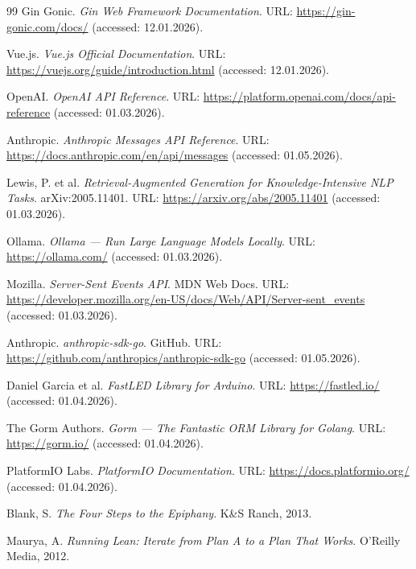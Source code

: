 \documentclass[a4paper,12pt]{article}
\begin{document}
\begin{thebibliography}{99}
Gin Gonic. \textit{Gin Web Framework Documentation}. URL: \url{https://gin-gonic.com/docs/} (accessed: 12.01.2026).

Vue.js. \textit{Vue.js Official Documentation}. URL: \url{https://vuejs.org/guide/introduction.html} (accessed: 12.01.2026).

OpenAI. \textit{OpenAI API Reference}. URL: \url{https://platform.openai.com/docs/api-reference} (accessed: 01.03.2026).

Anthropic. \textit{Anthropic Messages API Reference}. URL: \url{https://docs.anthropic.com/en/api/messages} (accessed: 01.05.2026).

Lewis, P. et al. \textit{Retrieval-Augmented Generation for Knowledge-Intensive NLP Tasks}. arXiv:2005.11401. URL: \url{https://arxiv.org/abs/2005.11401} (accessed: 01.03.2026).

Ollama. \textit{Ollama --- Run Large Language Models Locally}. URL: \url{https://ollama.com/} (accessed: 01.03.2026).

Mozilla. \textit{Server-Sent Events API}. MDN Web Docs. URL: \url{https://developer.mozilla.org/en-US/docs/Web/API/Server-sent_events} (accessed: 01.03.2026).

Anthropic. \textit{anthropic-sdk-go}. GitHub. URL: \url{https://github.com/anthropics/anthropic-sdk-go} (accessed: 01.05.2026).

Daniel Garcia et al. \textit{FastLED Library for Arduino}. URL: \url{https://fastled.io/} (accessed: 01.04.2026).

The Gorm Authors. \textit{Gorm --- The Fantastic ORM Library for Golang}. URL: \url{https://gorm.io/} (accessed: 01.04.2026).

PlatformIO Labs. \textit{PlatformIO Documentation}. URL: \url{https://docs.platformio.org/} (accessed: 01.04.2026).

Blank, S. \textit{The Four Steps to the Epiphany}. K\&S Ranch, 2013.

Maurya, A. \textit{Running Lean: Iterate from Plan A to a Plan That Works}. O'Reilly Media, 2012.

\end{thebibliography}

\newpage

\appendix
\end{document}
